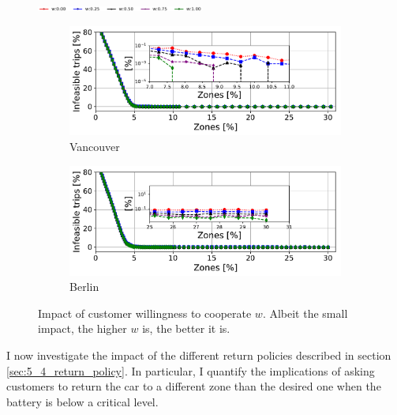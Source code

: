 \begin{figure}[t!]
  \begin{center}
	 \includegraphics[width=0.49\textwidth]{figures/legenda.pdf}
  \vspace{-1cm}
  \end{center}
    \begin{center}
         \begin{subfigure}{0.49\textwidth}
             \includegraphics[width=\columnwidth]{figures/cut_Vancouver_DeathsVsZones_Policy_44_tt-25_100_4.pdf}
             \caption{Vancouver}
             \label{fig:zone_vs_deaths_vancouver_willingness}
         \end{subfigure}         
         \begin{subfigure}{0.49\textwidth}
             \includegraphics[width=\columnwidth]{figures/cut_Berlino_DeathsVsZones_Policy_44_tt-25_100_4.pdf}
             \caption{Berlin}
             \label{fig:zone_vs_deaths_berlino_willingness}
         \end{subfigure}
         \caption{Impact of customer willingness to cooperate $w$. Albeit the small impact, the higher $w$ is, the better it is.}
         \label{fig:zone_vs_deaths_willingness}
\end{center}
\end{figure}
I now investigate the impact of the different return policies described in section \ref{sec:5_4_return_policy}. In particular, I quantify the implications of asking customers to return the car to a different zone than the desired one when the battery is below a critical level.


